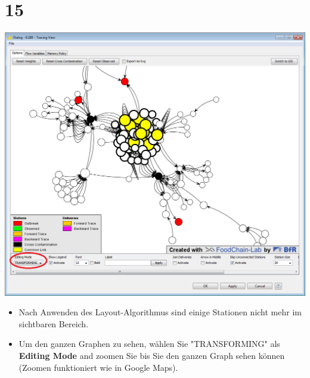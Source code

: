 \documentclass{beamer}
\begin{document}
\section{15}
\begin{frame}
	\begin{center}
  		\includegraphics[height=0.6\textheight]{15.png}
	\end{center}
	\begin{itemize}
		\item Nach Anwenden des Layout-Algorithmus sind einige Stationen nicht mehr im sichtbaren Bereich.
		\item Um den ganzen Graphen zu sehen, wählen Sie "TRANSFORMING" als \textbf{Editing Mode} and zoomen Sie bis Sie den ganzen Graph sehen können (Zoomen funktioniert wie in Google Maps).
	\end{itemize}
\end{frame}
\end{document}
